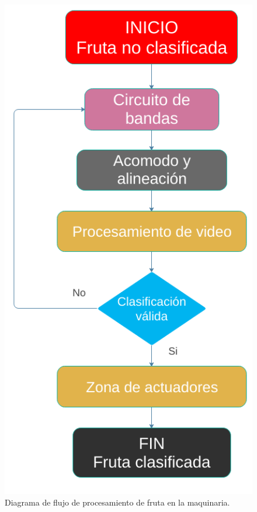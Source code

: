 \documentclass[twoside,spanish,ESP,MSc]{plantillaLabUPV}
\theoremstyle{definition}
\begin{document}
\begin{figure}
	\centering
	\includegraphics[scale=0.3]{edrawimas/diagramaflujomaquina}
	\caption{Diagrama de flujo de procesamiento de fruta en la maquinaria.}
	\label{fig:diagramaflujomaquina}
\end{figure}
\end{document}
